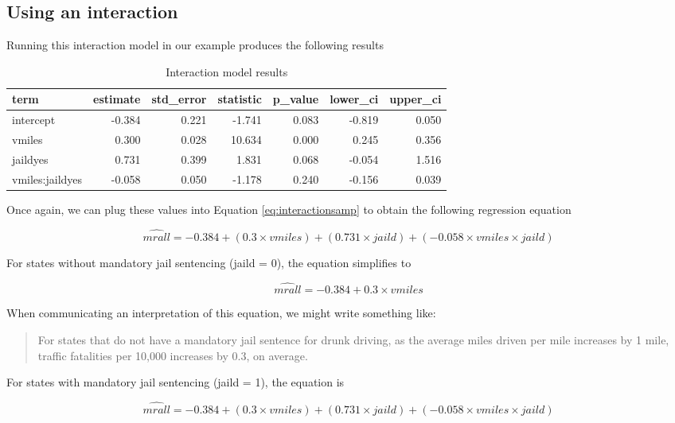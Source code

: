 \documentclass[
]{book}
\begin{document}
\hypertarget{using-an-interaction}{%
\subsection{Using an interaction}\label{using-an-interaction}}

Running this interaction model in our example produces the following results

\begin{table}

\caption{\label{tab:interactionmod}Interaction model results}
\centering
\begin{tabular}[t]{l|r|r|r|r|r|r}
\hline
term & estimate & std\_error & statistic & p\_value & lower\_ci & upper\_ci\\
\hline
intercept & -0.384 & 0.221 & -1.741 & 0.083 & -0.819 & 0.050\\
\hline
vmiles & 0.300 & 0.028 & 10.634 & 0.000 & 0.245 & 0.356\\
\hline
jaildyes & 0.731 & 0.399 & 1.831 & 0.068 & -0.054 & 1.516\\
\hline
vmiles:jaildyes & -0.058 & 0.050 & -1.178 & 0.240 & -0.156 & 0.039\\
\hline
\end{tabular}
\end{table}

Once again, we can plug these values into Equation \eqref{eq:interactionsamp} to obtain the following regression equation

\[\hat{mrall} = -0.384 + (0.3\times vmiles) + (0.731\times jaild) + (-0.058\times vmiles \times jaild)\]

For states without mandatory jail sentencing (jaild = 0), the equation simplifies to

\[\hat{mrall} = -0.384 + 0.3\times vmiles\]

When communicating an interpretation of this equation, we might write something like:

\begin{quote}
For states that do not have a mandatory jail sentence for drunk driving, as the average miles driven per mile increases by 1 mile, traffic fatalities per 10,000 increases by 0.3, on average.
\end{quote}

For states with mandatory jail sentencing (jaild = 1), the equation is

\[\hat{mrall} = -0.384 + (0.3\times vmiles) + (0.731\times jaild) + (-0.058\times vmiles \times jaild)\]
\end{document}
